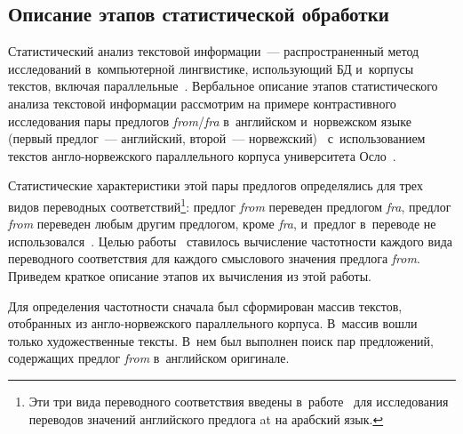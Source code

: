 \begin{multicols}{2}
  
\section{Описание этапов статистической обработки}


  Статистический анализ текстовой информации~--- рас\-про\-стра\-нен\-ный метод 
исследований в~компьютерной линг\-ви\-сти\-ке, ис\-поль\-зу\-ющий БД
и~корпусы текс\-тов, включая параллельные~\cite{6-zac, 7-zac, 8-zac, 9-zac}. 
Вер\-баль\-ное описание этапов ста\-ти\-сти\-че\-ско\-го анализа текс\-то\-вой информации 
рас\-смот\-рим на примере конт\-рас\-тив\-но\-го исследования пары предлогов 
\textit{from}/\textit{fra} в~английском и~норвежском языке (пер\-вый предлог~--- 
английский, второй~--- нор\-веж\-ский)~\cite{10-zac} с~использованием текс\-тов  
анг\-ло-нор\-веж\-ско\-го параллельного корпуса университета Осло~\cite{11-zac}.
  
  Статистические характеристики этой пары предлогов определялись для трех 
видов переводных соответствий\footnote[2]{Эти три 
вида переводного соответствия введены в~работе~\cite{11-zac} для исследования переводов значений 
английского предлога at на араб\-ский язык.}: пред\-лог \textit{from} переведен предлогом 
\textit{fra}, предлог \textit{from} переведен любым другим предлогом, кроме 
\textit{fra}, и~предлог в~переводе не использовался~\cite{12-zac}. \mbox{Целью} работы~\cite{10-zac} ставилось 
вы\-чис\-ле\-ние час\-тот\-ности каждого вида переводного соответствия для каж\-до\-го 
смыс\-ло\-во\-го значения предлога \textit{from}. Приведем крат\-кое описание этапов их 
вы\-чис\-ле\-ния из этой ра\-боты.
  
  Для определения час\-тот\-ности сначала был сформирован массив текс\-тов, 
отобранных из анг\-ло-нор\-веж\-ско\-го параллельного корпуса. В~мас\-сив во\-шли 
только художественные текс\-ты. В~нем был выполнен поиск пар предложений, 
содержащих пред\-лог \textit{from} в~английском ори\-ги\-нале.
  

\end{multicols}
